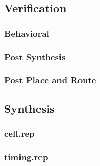 \documentclass[11pt,letterpaper,final]{article}
\begin{document}
\subsection{Verification}
\subsubsection{Behavioral}
\label{s3/behaviour}
\begin{scriptsize}
\end{scriptsize}
\subsubsection{Post Synthesis}
\label{s3/postsyn}

\begin{scriptsize}
\end{scriptsize}
\subsubsection{Post Place and Route}
\label{s3/postpr}
\begin{scriptsize}
\end{scriptsize}

\subsection{Synthesis}
\subsubsection{cell.rep}
\label{s3/cell.rep}
\begin{scriptsize}
\end{scriptsize}
\subsubsection{timing.rep}
\label{s3/timing.rep}
\begin{scriptsize}
\end{scriptsize}
\end{document}

